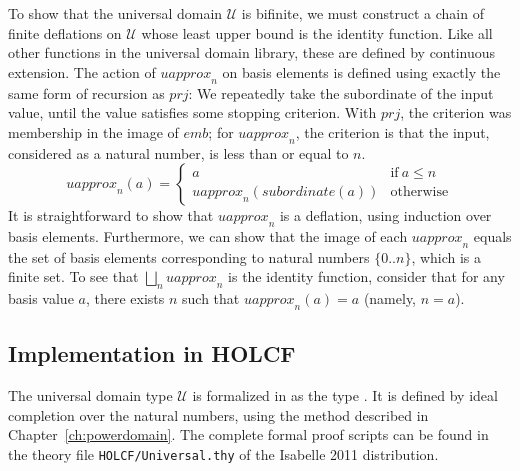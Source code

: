 To show that the universal domain $\mathcal{U}$ is bifinite, we must construct a chain of finite deflations on $\mathcal{U}$ whose least upper bound is the identity function. Like all other functions in the universal domain library, these are defined by continuous extension. The action of $\mathit{uapprox}_n$ on basis elements is defined using exactly the same form of recursion as $\mathit{prj}$: We repeatedly take the subordinate of the input value, until the value satisfies some stopping criterion. With $\mathit{prj}$, the criterion was membership in the image of $\mathit{emb}$; for $\mathit{uapprox}_n$, the criterion is that the input, considered as a natural number, is less than or equal to $n$.
%
\begin{equation}
\mathit{uapprox}_n(a) =
\begin{cases}
a & \mbox{if}~a \le n \\
\mathit{uapprox}_n(\mathit{subordinate}(a)) & \mbox{otherwise}
\end{cases}
\label{eq:universal-uapprox}
\end{equation}
%
It is straightforward to show that $\mathit{uapprox}_n$ is a deflation, using induction over basis elements. Furthermore, we can show that the image of each $\mathit{uapprox}_n$ equals the set of basis elements corresponding to natural numbers $\{0..n\}$, which is a finite set. To see that $\bigsqcup_n \mathit{uapprox}_n$ is the identity function, consider that for any basis value $a$, there exists $n$ such that $\mathit{uapprox}_n(a) = a$ (namely, $n = a$).

\subsection{Implementation in HOLCF}

The universal domain type $\mathcal{U}$ is formalized in  as the type . It is defined by ideal completion over the natural numbers, using the method described in Chapter~\ref{ch:powerdomain}. The complete formal proof scripts can be found in the theory file \texttt{HOLCF/Universal.thy} of the Isabelle 2011 distribution.

